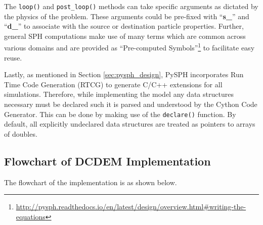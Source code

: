 The \lstinline!loop()! and \lstinline!post_loop()! methods can take specific arguments as dictated by the physics of the problem. These arguments could be pre-fixed with ``\textbf{s\_}'' and ``\textbf{d\_}'' to associate with the source or destination particle properties. Further, general SPH computations make use of many terms which are common across various domains and are provided as ``Pre-computed Symbols''\footnote[10]{\url{http://pysph.readthedocs.io/en/latest/design/overview.html\#writing-the-equations}} to facilitate easy reuse.

Lastly, as mentioned in Section \ref{sec:pysph_design}, PySPH incorporates Run Time Code Generation (RTCG) to generate C/C++ extensions for all simulations. Therefore, while implementing the model any data structures necessary must be declared such it is parsed and understood by the Cython Code Generator. This can be done by making use of the \lstinline!declare()! function. By default, all explicitly undeclared data structures are treated as pointers to arrays of doubles.

\subsection{Flowchart of DCDEM Implementation}

The flowchart of the implementation is as shown below. 